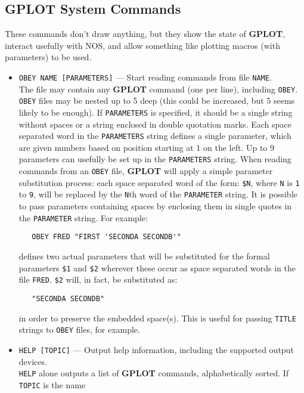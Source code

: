 \documentclass[a4paper,twoside,11pt]{article}
\newcommand{\textttc}[1]{\texttt{\textcolor{OurRed}{#1}}}
\begin{document}
\subsection{\textbf{GPLOT} System Commands}
These commands don't draw anything, but they show the state of \textbf{GPLOT}, interact usefully with NOS, and allow
something like plotting macros (with parameters) to be used.
\begin{itemize}
\item \textttc{OBEY NAME [PARAMETERS]} --- Start reading commands from file \texttt{NAME}.\label{obfile}\\
   The file may contain any \textbf{GPLOT} command (one per line), including \texttt{OBEY}. \texttt{OBEY} files may be
   nested up to 5 deep (this could be increased, but 5 seems likely to be enough). If \texttt{PARAMETERS}
   is specified, it should be a single string without spaces or a string enclosed in double quotation
   marks. Each space separated word in the \texttt{PARAMETERS} string defines a single parameter, which are
   given numbers based on position starting at 1 on the left. Up to 9 parameters can usefully be set up
   in the \texttt{PARAMETERS} string. When reading commands from an \texttt{OBEY} file, \textbf{GPLOT} will apply a simple
   parameter substitution process: each space separated word of the form: \texttt{\$N}, where \texttt{N} 
   is \texttt{1} to \texttt{9}, will
   be replaced by the \texttt{N}th word of the \texttt{PARAMETER} string. It is possible to pass parameters containing spaces
   by enclosing them in single quotes in the \texttt{PARAMETER} string. For example:
   \begin{verbatim}
   OBEY FRED "FIRST 'SECONDA SECONDB'"
   \end{verbatim}
   defines two actual parameters that will be substituted for the formal parameters \texttt{\$1} and \texttt{\$2} wherever
   these occur as space separated words in the file \texttt{FRED}. \texttt{\$2} will, in fact, be substituted as:
   \begin{verbatim}
   "SECONDA SECONDB"
   \end{verbatim}
   in order to preserve the embedded space(s). This is useful for passing \texttt{TITLE} strings to \texttt{OBEY} files,
   for example.
 \item \textttc{HELP [TOPIC]} --- Output help information, including the supported output devices.\\
   \texttt{HELP} alone outputs a list of \textbf{GPLOT} commands, alphabetically sorted. If \texttt{TOPIC} is the name

\end{itemize}
\end{document}
